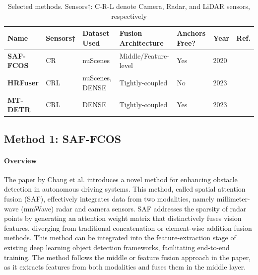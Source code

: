 \documentclass[report.tex]{subfiles}
\begin{document}
        \begin{table}[h]
            \centering
            \caption{Selected methods. Sensors†: C-R-L denote Camera, Radar, and LiDAR sensors, respectively}
            \begin{tabular}{|l|l|l|l|l|l|l|}
            \hline
            \textbf{Name} & \textbf{Sensors†} & \textbf{Dataset Used} & \textbf{Fusion Architecture} & \textbf{Anchors Free?} & \textbf{Year} & \textbf{Ref.}\\ \hline
            \textbf{SAF-FCOS} & CR & nuScenes & Middle/Feature-level & Yes & 2020 & \cite{chang2020spatial} \\ \hline
            \textbf{HRFuser} & CRL & nuScenes, DENSE & Tightly-coupled & No & 2023 & \cite{broedermann2022hrfuser} \\ \hline
            \textbf{MT-DETR} & CRL & DENSE & Tightly-coupled & Yes & 2023 & \cite{chu2023mt} \\ \hline
            \end{tabular}
            \label{tab:selected_methods}
        \end{table}

    

    \subsection{Method 1: SAF-FCOS}

    \paragraph{Overview}
    
    The paper by Chang et al. \cite{chang2020spatial} introduces a novel method for enhancing obstacle detection in autonomous driving systems. This method, called spatial attention fusion (SAF), effectively integrates data from two modalities, namely millimeter-wave (mmWave) radar and camera sensors. SAF addresses the sparsity of radar points by generating an attention weight matrix that distinctively fuses vision features, diverging from traditional concatenation or element-wise addition fusion methods. This method can be integrated into the feature-extraction stage of existing deep learning object detection frameworks, facilitating end-to-end training. The method follows the middle or feature fusion approach in the paper, as it extracts features from both modalities and fuses them in the middle layer. 
\end{document}
